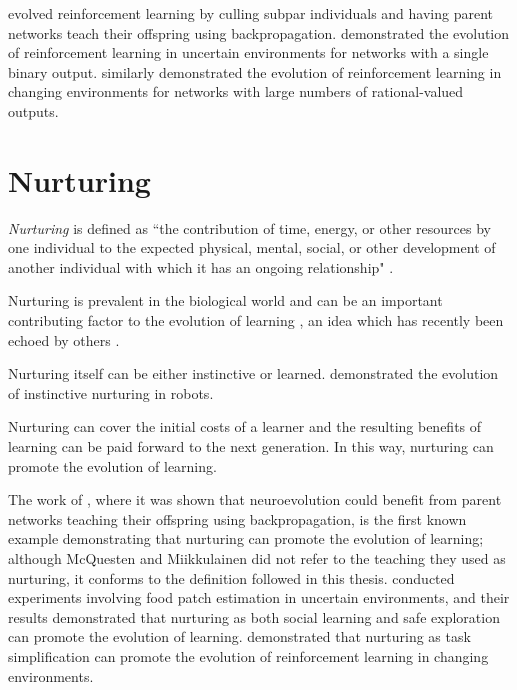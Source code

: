 \documentclass[master]{outhesis}
\begin{document}

\citet{McQuesten:1997aa} evolved reinforcement learning by culling subpar individuals and having parent networks teach their offspring using backpropagation.
\citet{Niv:2002aa} demonstrated the evolution of reinforcement learning in uncertain environments for networks with a single binary output.
\citet{Shah:2015hs} similarly demonstrated the evolution of reinforcement learning in changing environments for networks with large numbers of rational-valued outputs.

\section{Nurturing}

\emph{Nurturing} is defined as ``the contribution of time, energy, or other resources by one individual to the expected physical, mental, social, or other development of another individual with which it has an ongoing relationship" \citep{Woehrer:2012aa}.

Nurturing is prevalent in the biological world and can be an important contributing factor to the evolution of learning \citep{Woehrer:2012aa,Eskridge:2012aa},
an idea which has recently been echoed by others \citep{Soltoggio:2017bl}.

Nurturing itself can be either instinctive or learned.
\citet{Leonce:2012aa} demonstrated the evolution of instinctive nurturing in robots.


Nurturing can cover the initial costs of a learner and the resulting benefits of learning can be paid forward to the next generation.
In this way, nurturing can promote the evolution of learning.

The work of \citet{McQuesten:1997aa},
where it was shown that neuroevolution could benefit from parent networks teaching their offspring using backpropagation,
is the first known example demonstrating that nurturing can promote the evolution of learning;
although McQuesten and Miikkulainen did not refer to the teaching they used as nurturing,
it conforms to the definition followed in this thesis.
\citet{Eskridge:2012aa} conducted experiments involving food patch estimation in uncertain environments,
and their results demonstrated that nurturing as both social learning and safe exploration can promote the evolution of learning.
\citet{Shah:2015hs} demonstrated that nurturing as task simplification can promote the evolution of reinforcement learning in changing environments.
\end{document}

